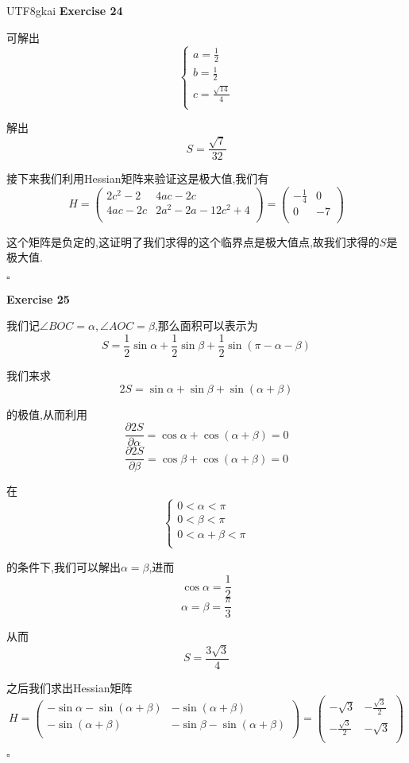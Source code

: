 \documentclass[11pt,hyperref,a4paper,UTF8]{ctexart}
\newenvironment{exercise}[1]{%
{\textbf{Exercise #1} \\ 
    }
}{
  \hfill $\square$ 
  \par\bigskip 
}
\begin{document}
\begin{CJK}{UTF8}{gkai}
\begin{exercise}{24}
    可解出
    \[\begin{cases}
        a = \frac{1}{2}\\
        b = \frac{1}{2}\\
        c = \frac{\sqrt{14}}{4}\\
    \end{cases}\]

    解出
    \[S = \frac{\sqrt{7}}{32}\]

    接下来我们利用Hessian矩阵来验证这是极大值,我们有
    \[H = \begin{pmatrix}
        2c^2 - 2&4ac - 2c\\
        4ac - 2c&2a^2 - 2a - 12c^2 + 4\\
    \end{pmatrix} = \begin{pmatrix}
        -\frac{1}{4}&0\\
        0&-7\\
    \end{pmatrix}\]

    这个矩阵是负定的,这证明了我们求得的这个临界点是极大值点,故我们求得的$S$是极大值.
\end{exercise}

\begin{exercise}{25}
    我们记$\angle BOC = \alpha,\angle AOC = \beta$,那么面积可以表示为
    \[S = \frac{1}{2}\sin \alpha + \frac{1}{2}\sin \beta + \frac{1}{2} \sin (\pi - \alpha - \beta)\]

    我们来求
    \[2S = \sin \alpha + \sin \beta + \sin(\alpha + \beta)\]

    的极值,从而利用
    \[\frac{\partial 2S}{\partial \alpha} = \cos \alpha + \cos (\alpha + \beta) = 0\]
    \[\frac{\partial 2S}{\partial \beta} =  \cos \beta + \cos (\alpha + \beta) = 0\]

    在
    \[\begin{cases}
        0 < \alpha < \pi\\
        0 < \beta < \pi\\
        0 < \alpha + \beta < \pi\\
    \end{cases}\]

    的条件下,我们可以解出$\alpha = \beta$,进而
    \[\cos \alpha = \frac{1}{2}\]
    \[\alpha = \beta = \frac{\pi}{3}\]

    从而
    \[S = \frac{3\sqrt{3}}{4}\]

    之后我们求出Hessian矩阵
    \[H = \begin{pmatrix}
        -\sin \alpha - \sin(\alpha + \beta)&-\sin(\alpha + \beta)\\
        -\sin(\alpha + \beta)&-\sin \beta - \sin(\alpha + \beta)\\
    \end{pmatrix} = \begin{pmatrix}
        -\sqrt{3}&-\frac{\sqrt{3}}{2}\\
        -\frac{\sqrt{3}}{2}&-\sqrt{3}\\
    \end{pmatrix}\]


\end{exercise}
\end{CJK}
\end{document}

